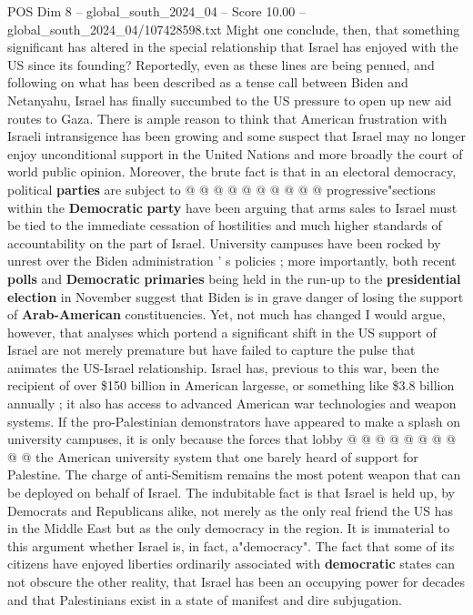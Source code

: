 \begin{textsample}{POS Dim 8 – global\_south\_2024\_04 – Score 10.00 – global\_south\_2024\_04/107428598.txt}
Might one conclude, then, that something significant has altered in the special relationship that Israel has enjoyed with the US since its founding?
Reportedly, even as these lines are being penned, and following on what has been described as a tense call between Biden and Netanyahu, Israel has finally succumbed to the US pressure to open up new aid routes to Gaza.
There is ample reason to think that American frustration with Israeli intransigence has been growing and some suspect that Israel may no longer enjoy unconditional support in the United Nations and more broadly the court of world public opinion.
Moreover, the brute fact is that in an electoral democracy, political \textbf{parties} are subject to @ @ @ @ @ @ @ @ @ @ progressive"sections within the \textbf{Democratic} \textbf{party} have been arguing that arms sales to Israel must be tied to the immediate cessation of hostilities and much higher standards of accountability on the part of Israel.
University campuses have been rocked by unrest over the Biden administration ' s policies ; more importantly, both recent \textbf{polls} and \textbf{Democratic} \textbf{primaries} being held in the run-up to the \textbf{presidential} \textbf{election} in November suggest that Biden is in grave danger of losing the support of \textbf{Arab-American} constituencies.
Yet, not much has changed I would argue, however, that analyses which portend a significant shift in the US support of Israel are not merely premature but have failed to capture the pulse that animates the US-Israel relationship.
Israel has, previous to this war, been the recipient of over \$150 billion in American largesse, or something like \$3.8 billion annually ; it also has access to advanced American war technologies and weapon systems.
If the pro-Palestinian demonstrators have appeared to make a splash on university campuses, it is only because the forces that lobby @ @ @ @ @ @ @ @ @ @ the American university system that one barely heard of support for Palestine.
The charge of anti-Semitism remains the most potent weapon that can be deployed on behalf of Israel.
The indubitable fact is that Israel is held up, by Democrats and Republicans alike, not merely as the only real friend the US has in the Middle East but as the only democracy in the region.
It is immaterial to this argument whether Israel is, in fact, a"democracy".
The fact that some of its citizens have enjoyed liberties ordinarily associated with \textbf{democratic} states can not obscure the other reality, that Israel has been an occupying power for decades and that Palestinians exist in a state of manifest and dire subjugation.

\end{textsample}
